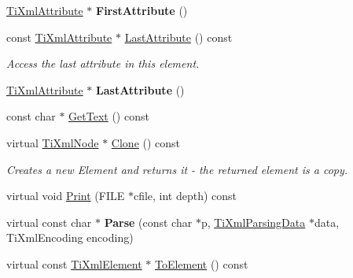 \begin{DoxyCompactItemize}
\mbox{\label{classTiXmlElement_a4b33780fc565d38d6b54f640e0cf1737}} 
\hyperlink{classTiXmlAttribute}{Ti\+Xml\+Attribute} $\ast$ {\bfseries First\+Attribute} ()
\item 
\mbox{\label{classTiXmlElement_a42939f55ed4cec5fc1daaecfded7ba16}} 
const \hyperlink{classTiXmlAttribute}{Ti\+Xml\+Attribute} $\ast$ \hyperlink{classTiXmlElement_a42939f55ed4cec5fc1daaecfded7ba16}{Last\+Attribute} () const
\begin{DoxyCompactList}\small\item\em Access the last attribute in this element. \end{DoxyCompactList}\item 
\mbox{\label{classTiXmlElement_a222f81cf06155cd108f2a68d4d176004}} 
\hyperlink{classTiXmlAttribute}{Ti\+Xml\+Attribute} $\ast$ {\bfseries Last\+Attribute} ()
\item 
const char $\ast$ \hyperlink{classTiXmlElement_af0f814ecbd43d50d4cdbdf4354d3da39}{Get\+Text} () const
\item 
\mbox{\label{classTiXmlElement_a810ea8fa40844c01334e5af2a26794cb}} 
virtual \hyperlink{classTiXmlNode}{Ti\+Xml\+Node} $\ast$ \hyperlink{classTiXmlElement_a810ea8fa40844c01334e5af2a26794cb}{Clone} () const
\begin{DoxyCompactList}\small\item\em Creates a new Element and returns it -\/ the returned element is a copy. \end{DoxyCompactList}\item 
virtual void \hyperlink{classTiXmlElement_aa31a15cddfb8601a31236fe7d2569fb4}{Print} (F\+I\+LE $\ast$cfile, int depth) const
\item 
\mbox{\label{classTiXmlElement_af95c9165159fd9dfdcc5b894a3fcf85b}} 
virtual const char $\ast$ {\bfseries Parse} (const char $\ast$p, \hyperlink{classTiXmlParsingData}{Ti\+Xml\+Parsing\+Data} $\ast$data, Ti\+Xml\+Encoding encoding)
\item 
\mbox{\label{classTiXmlElement_a940fc8aa953e0ef0de6e110b7d98b8ee}} 
virtual const \hyperlink{classTiXmlElement}{Ti\+Xml\+Element} $\ast$ \hyperlink{classTiXmlElement_a940fc8aa953e0ef0de6e110b7d98b8ee}{To\+Element} () const

\end{DoxyCompactItemize}
